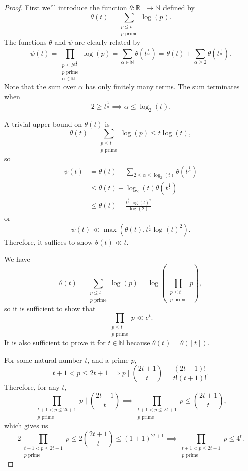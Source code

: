 \documentclass[12pt]{amsart}
\begin{document}
\begin{proof}
First we'll introduce the function \(\theta : \mathbb{R} ^{+ } \to \mathbb{N} \) defined by
\[
    \theta(t) = \sum _{\substack{ p \leq t \\ p \text{ prime}  }} \log \left( p \right)
.\]
The functions \(\theta\) and \(\psi\) are clearly related by
\[
    \psi(t) = \prod _{\substack{ p \leq N^{\frac{1}{\alpha} } \\ p \text{ prime} \\ \alpha \in \mathbb{N}  }} \log \left( p \right) = \sum _{\alpha \in \mathbb{N} } \theta\left( t ^{\frac{1}{\alpha} } \right)  = \theta(t) + \sum _{\alpha \geq 2} \theta \left( t ^{\frac{1}{\alpha} } \right) 
.\]
Note that the sum over \(\alpha\) has only finitely many terms. The sum terminates when
\[
    2 \geq  t^{\frac{1}{\alpha} } \implies  \alpha \leq \log _{2} \left( t \right) 
.\]

A trivial upper bound on \(\theta (t)\) is
\[
    \theta(t) = \sum _{\substack{ p \leq t \\ p \text{ prime}}} \log \left( p \right) \leq t \log \left( t \right)  
,\]
so
\begin{align*}
    \psi(t) & = \theta(t) + \sum _{2 \leq \alpha \leq \log _{2} \left( t \right) } \theta(t ^{\frac{1}{\alpha} }) \\
    & \leq \theta(t) + \log _{2} \left( t \right) \theta(t^{\frac{1}{2} }) \\
    & \leq \theta(t) + \frac{t^{\frac{1}{2} }\log \left( t \right) ^{2}}{\log \left( 2 \right) }
\end{align*}
or
\[
    \psi(t) \ll \max \left( \theta(t), t^{\frac{1}{2} }\log \left( t \right) ^{2} \right) 
.\]
Therefore, it suffices to show \(\theta(t) \ll t\).

We have
\[
    \theta(t) = \sum _{\substack{ p \leq t \\ p \text{ prime}  }} \log \left( p \right) = \log \left( \prod _{\substack{ p \leq t \\  p \text{ prime}  }} p \right) 
,\]
so it is sufficient to show that
\[
    \prod _{\substack{ p \leq t \\ p \text{ prime}  }} p \ll e^{t}
.\]
It is also sufficient to prove it for \(t \in \mathbb{N} \) because \(\theta(t) = \theta\left( \left\lfloor t \right\rfloor  \right) \).

For some natural number \(t\), and a prime \(p\),
\[
    t + 1 < p \leq 2t + 1 \implies p \mid \binom{2t + 1}{t} = \frac{\left( 2t + 1 \right) !}{t! (t+1)!} 
.\]
Therefore, for any \(t\),
\[
    \prod _{\substack{ t + 1 < p \leq 2t + 1\\ p \text{ prime}   }} p   \mid \binom{2t+1}{t} \implies \prod _{\substack{ t + 1 < p \leq 2t + 1\\ p \text{ prime}   }} p   \leq  \binom{2t+1}{t}
,\]
which gives us
\[
    2 \prod _{\substack{ t + 1 < p \leq 2t + 1\\ p \text{ prime}   }} p   \leq  2 \binom{2t+1}{t} \leq (1+1)^{2t + 1} \implies \prod _{\substack{ t + 1 < p \leq 2t + 1\\ p \text{ prime}   }} p  \leq 4^{t}
.\]


\end{proof}
\end{document}
